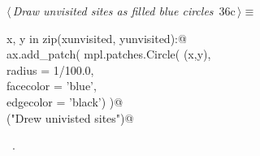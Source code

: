 \documentclass[11.5pt]{report}
\begin{document}
\begin{flushleft} \small\label{scrap44}\raggedright\small
{} $\langle\,${\itshape Draw unvisited sites as filled blue circles}\nobreak\ {\footnotesize {36c}}$\,\rangle\equiv$
\vspace{-1ex}
\begin{list}{}{} \item
\mbox{}\verb@for x, y in zip(xunvisited, yunvisited):@\\
\mbox{}\verb@     ax.add_patch( mpl.patches.Circle( (x,y),\@\\
\mbox{}\verb@                                    radius    = 1/100.0,\@\\
\mbox{}\verb@                                    facecolor = 'blue',\@\\
\mbox{}\verb@                                    edgecolor = 'black')  )@\\
\mbox{}\verb@debug("Drew univisted sites")@\\
\mbox{}\verb@@{\NWsep}
\end{list}
\vspace{-1.5ex}
\footnotesize
\begin{list}{}{\setlength{\itemsep}{-\parsep}\setlength{\itemindent}{-\leftmargin}}
\item \NWtxtMacroRefIn\ .

\item{}
\end{list}
\vspace{4ex}
\end{flushleft}


\vspace{-0.8cm}\newchunk 
\end{document}
